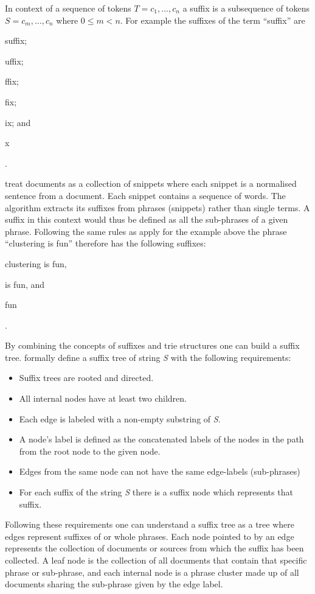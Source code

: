 In context of a sequence of tokens \(T = c_{1}, ..., c_{n}\) a suffix is a subsequence of tokens \(S = c_{m}, \dots, c_{n}\) where \(0 \le m < n\). For example the suffixes of the term ``suffix'' are
\begin{inparaenum}[\itshape 1\upshape)]
\item suffix;
\item uffix;
\item ffix;
\item fix;
\item ix; and
\item x
\end{inparaenum}.

\cite{Oren1998} treat documents as a collection of snippets where each snippet is a normalised sentence from a document. Each snippet contains a sequence of words. The \STC algorithm extracts its suffixes from phrases (snippets) rather than single terms. A suffix in this context would thus be defined as all the sub-phrases of a given phrase. Following the same rules as apply for the example above the phrase ``clustering is fun'' therefore has the following suffixes:
\begin{inparaenum}[\itshape 1\upshape)]
\item clustering is fun,
\item is fun, and
\item fun
\end{inparaenum}.

By combining the concepts of suffixes and trie structures one can build a suffix tree. \cite{Oren1998} formally define a suffix tree of string \textit{S} with the following requirements:
\begin{itemize}
\item Suffix trees are rooted and directed.
\item All internal nodes have at least two children.
\item Each edge is labeled with a non-empty substring of \textit{S}.
\item A node's label is defined as the concatenated labels of the nodes in the path from the root node to the given node.
\item Edges from the same node can not have the same edge-labels (sub-phrases)
\item For each suffix of the string \textit{S} there is a suffix node which represents that suffix.
\end{itemize}

Following these requirements one can understand a suffix tree as a tree where edges represent suffixes of or whole phrases. Each node pointed to by an edge represents the collection of documents or sources from which the suffix has been collected. A leaf node is the collection of all documents that contain that specific phrase or sub-phrase, and each internal node is a phrase cluster made up of all documents sharing the sub-phrase given by the edge label.

